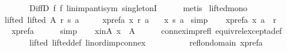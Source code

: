 \begin{isabellebody}
\ \ \ \ \ \ \ \ \ \ DiffD{}\ f{}{\isacharunderscore}{\kern0pt}{}\ f{}\ lin{\isacharunderscore}{\kern0pt}imp{\isacharunderscore}{\kern0pt}antisym\ singletonI\isanewline
\ \ \ \ \isamarkupfalse%
\ metis\isanewline
{}\isamarkupfalse%
%
\endisatagproof
{\isafoldproof}%
%
\isadelimproof
\isanewline
%
\endisadelimproof
\isanewline
{}\isamarkupfalse%
\ lifted{\isacharunderscore}{\kern0pt}mono{}{\isacharcolon}{\kern0pt}\isanewline
\ \ \isanewline
\ \ \ \ lifted{\isacharcolon}{\kern0pt}\ {\isachardoublequoteopen}lifted\ A\ r\ s\ a{\isachardoublequoteclose}\ \isanewline
\ \ \ \ x{\isacharunderscore}{\kern0pt}pref{\isacharunderscore}{\kern0pt}a{\isacharcolon}{\kern0pt}\ {\isachardoublequoteopen}x\ {\isasympreceq}\isactrlsub r\ a{\isachardoublequoteclose}\isanewline
\ \ \ {\isachardoublequoteopen}x\ {\isasympreceq}\isactrlsub s\ a{\isachardoublequoteclose}\isanewline
%
\isadelimproof
%
\endisadelimproof
%
\isatagproof
{}\isamarkupfalse%
\ {\isacharparenleft}{\kern0pt}simp{\isacharparenright}{\kern0pt}\isanewline
\ \ \isamarkupfalse%
\ x{\isacharunderscore}{\kern0pt}pref{\isacharunderscore}{\kern0pt}a{\isacharunderscore}{\kern0pt}{}{\isacharcolon}{\kern0pt}\ {\isachardoublequoteopen}{\isacharparenleft}{\kern0pt}x{\isacharcomma}{\kern0pt}\ a{\isacharparenright}{\kern0pt}\ {\isasymin}\ r{\isachardoublequoteclose}\isanewline
\ \ \ \ \isamarkupfalse%
\ x{\isacharunderscore}{\kern0pt}pref{\isacharunderscore}{\kern0pt}a\isanewline
\ \ \ \ \isamarkupfalse%
\ simp\isanewline
\ \ \isamarkupfalse%
\ x{\isacharunderscore}{\kern0pt}in{\isacharunderscore}{\kern0pt}A{\isacharcolon}{\kern0pt}\ {\isachardoublequoteopen}x\ {\isasymin}\ A{\isachardoublequoteclose}\isanewline
\ \ \ \ \isamarkupfalse%
\ connex{\isacharunderscore}{\kern0pt}imp{\isacharunderscore}{\kern0pt}refl\ equiv{\isacharunderscore}{\kern0pt}rel{\isacharunderscore}{\kern0pt}except{\isacharunderscore}{\kern0pt}a{\isacharunderscore}{\kern0pt}def\isanewline
\ \ \ \ \ \ \ \ \ \ lifted\ lifted{\isacharunderscore}{\kern0pt}def\ lin{\isacharunderscore}{\kern0pt}ord{\isacharunderscore}{\kern0pt}imp{\isacharunderscore}{\kern0pt}connex\isanewline
\ \ \ \ \ \ \ \ \ \ refl{\isacharunderscore}{\kern0pt}on{\isacharunderscore}{\kern0pt}domain\ x{\isacharunderscore}{\kern0pt}pref{\isacharunderscore}{\kern0pt}a{\isacharunderscore}{\kern0pt}{}\isanewline
\ \ \ \ \isamarkupfalse%

\end{isabellebody}
